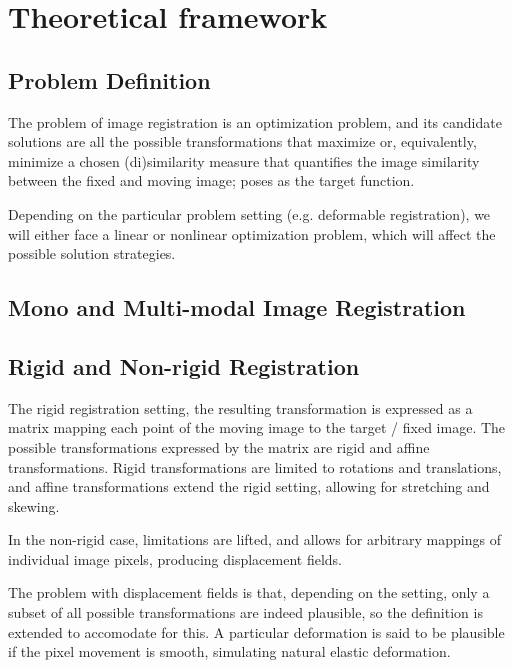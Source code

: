 
\cleardoublepage

\chapter{Theoretical framework}
\label{theoretical-framework}

\section{Problem Definition}
\label{problem-definition}
The problem of image registration is an optimization problem, and its candidate solutions are all the possible transformations that maximize or, equivalently, minimize a chosen (di)similarity measure that quantifies the image similarity between the fixed and moving image; poses as the target function.

Depending on the particular problem setting (e.g. deformable registration), we will either face a linear or nonlinear optimization problem, which will affect the possible solution strategies.

\section{Mono and Multi-modal Image Registration}
\label{mono-multimodal-registration}

\section{Rigid and Non-rigid Registration}
\label{image-a}
The rigid registration setting, the resulting transformation is expressed as a matrix mapping each point of the moving image to the target / fixed image. The possible transformations expressed by the matrix are rigid and affine transformations. Rigid transformations are limited to rotations and translations, and affine transformations extend the rigid setting, allowing for stretching and skewing.

In the non-rigid case, limitations are lifted, and allows for arbitrary mappings of individual image pixels, producing displacement fields. 

The problem with displacement fields is that, depending on the setting, only a subset of all possible transformations are indeed plausible, so the definition is extended to accomodate for this. A particular deformation is said to be plausible if the pixel movement is smooth, simulating natural elastic deformation.

